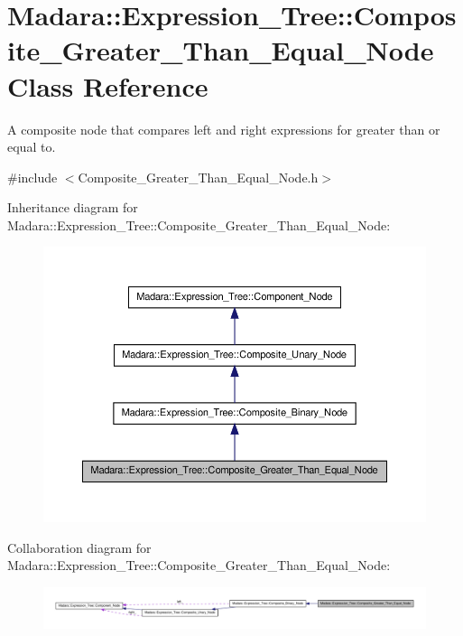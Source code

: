 \hypertarget{classMadara_1_1Expression__Tree_1_1Composite__Greater__Than__Equal__Node}{
\section{Madara::Expression\_\-Tree::Composite\_\-Greater\_\-Than\_\-Equal\_\-Node Class Reference}
\label{d0/d08/classMadara_1_1Expression__Tree_1_1Composite__Greater__Than__Equal__Node}
}


A composite node that compares left and right expressions for greater than or equal to.  




{\ttfamily \#include $<$Composite\_\-Greater\_\-Than\_\-Equal\_\-Node.h$>$}



Inheritance diagram for Madara::Expression\_\-Tree::Composite\_\-Greater\_\-Than\_\-Equal\_\-Node:
\nopagebreak
\begin{figure}[H]
\begin{center}
\leavevmode
\includegraphics[width=384pt]{df/dc5/classMadara_1_1Expression__Tree_1_1Composite__Greater__Than__Equal__Node__inherit__graph}
\end{center}
\end{figure}


Collaboration diagram for Madara::Expression\_\-Tree::Composite\_\-Greater\_\-Than\_\-Equal\_\-Node:
\nopagebreak
\begin{figure}[H]
\begin{center}
\leavevmode
\includegraphics[width=400pt]{d2/d33/classMadara_1_1Expression__Tree_1_1Composite__Greater__Than__Equal__Node__coll__graph}
\end{center}
\end{figure}
